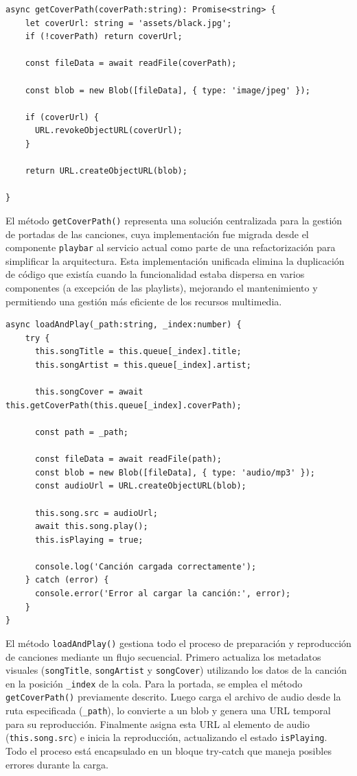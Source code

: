 \documentclass[11pt, a4paper]{article}
\begin{document}
                \begin{lstlisting}[caption={getCoverPath()}]
async getCoverPath(coverPath:string): Promise<string> {
    let coverUrl: string = 'assets/black.jpg';
    if (!coverPath) return coverUrl;

    const fileData = await readFile(coverPath);
    
    const blob = new Blob([fileData], { type: 'image/jpeg' });

    if (coverUrl) {
      URL.revokeObjectURL(coverUrl);
    }

    return URL.createObjectURL(blob);

}
                \end{lstlisting}

                El método \texttt{getCoverPath()} representa una solución centralizada para la gestión de portadas de las canciones, cuya implementación fue migrada desde el componente \texttt{playbar} al servicio actual como parte de una refactorización para simplificar la arquitectura. Esta implementación unificada elimina la duplicación de código que existía cuando la funcionalidad estaba dispersa en varios componentes (a excepción de las playlists), mejorando el mantenimiento y permitiendo una gestión más eficiente de los recursos multimedia.

                \begin{lstlisting}[caption={loadAndPlay()}]
async loadAndPlay(_path:string, _index:number) {
    try {
      this.songTitle = this.queue[_index].title;
      this.songArtist = this.queue[_index].artist;
      
      this.songCover = await this.getCoverPath(this.queue[_index].coverPath);

      const path = _path;
      
      const fileData = await readFile(path);
      const blob = new Blob([fileData], { type: 'audio/mp3' });
      const audioUrl = URL.createObjectURL(blob);
      
      this.song.src = audioUrl;
      await this.song.play();
      this.isPlaying = true;
      
      console.log('Canción cargada correctamente');
    } catch (error) {
      console.error('Error al cargar la canción:', error);
    }
}
                \end{lstlisting}

                El método \texttt{loadAndPlay()} gestiona todo el proceso de preparación y reproducción de canciones mediante un flujo secuencial. Primero actualiza los metadatos visuales (\texttt{songTitle}, \texttt{songArtist} y \texttt{songCover}) utilizando los datos de la canción en la posición \texttt{\_index} de la cola. Para la portada, se emplea el método \texttt{getCoverPath()} previamente descrito. Luego carga el archivo de audio desde la ruta especificada (\texttt{\_path}), lo convierte a un blob y genera una URL temporal para su reproducción. Finalmente asigna esta URL al elemento de audio (\texttt{this.song.src}) e inicia la reproducción, actualizando el estado \texttt{isPlaying}. Todo el proceso está encapsulado en un bloque try-catch que maneja posibles errores durante la carga.
\end{document}
